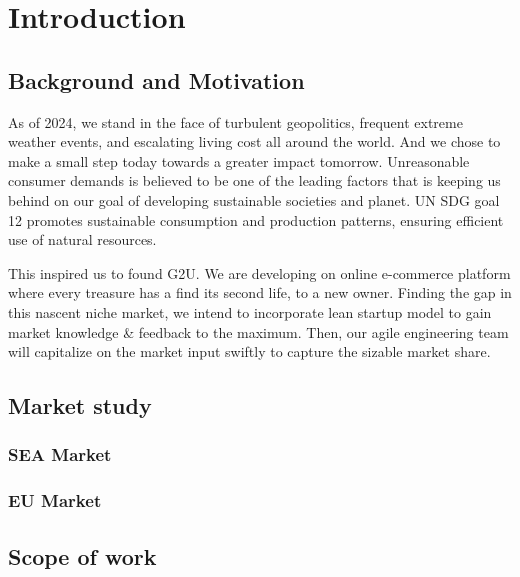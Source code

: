 %
%
\chapter{Introduction}

\section{Background and Motivation}

As of 2024, we stand in the face of turbulent geopolitics, frequent extreme weather events, and escalating living cost all around the world. And we chose to make a small step today towards a greater impact tomorrow. Unreasonable consumer demands is believed to be one of the leading factors that is keeping us behind on our goal of developing sustainable societies and planet. UN SDG goal 12 promotes sustainable consumption and production patterns, ensuring efficient use of natural resources.

This inspired us to found G2U. We are developing on online e-commerce platform where every treasure has a find its second life, to a new owner. Finding the gap in this nascent niche market, we intend to incorporate lean startup model to gain market knowledge \& feedback to the maximum. Then, our agile engineering team will capitalize on the market input swiftly to capture the sizable market share.



\section{Market study}


\subsection{SEA Market}

\subsection{EU Market}

\section{Scope of work}

